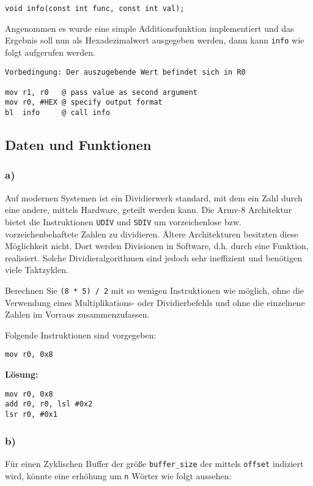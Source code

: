 \documentclass[12pt]{article}
\begin{document}
\begin{lstlisting}
void info(const int func, const int val);
\end{lstlisting}

Angenommen es wurde eine simple Additionsfunktion implementiert und das Ergebnis
soll nun als Hexadezimalwert ausgegeben werden, dann kann \texttt{info} wie
folgt aufgerufen werden.

\begin{lstlisting}
Vorbedingung: Der auszugebende Wert befindet sich in R0

mov r1, r0   @ pass value as second argument
mov r0, #HEX @ specify output format
bl  info     @ call info
\end{lstlisting}


\subsection{Daten und Funktionen}
\subsubsection{a)}
Auf modernen Systemen ist ein Dividierwerk standard, mit dem ein Zahl durch eine
andere, mittels Hardware, geteilt werden kann. Die Armv-8 Architektur bietet
die Instruktionen \texttt{UDIV} und \texttt{SDIV} um vorzeichenlose bzw.
vorzeichenbehaftete Zahlen zu dividieren. Ältere Architekturen besitzten diese
Möglichkeit nicht. Dort werden Divisionen in Software, d.h. durch eine Funktion, realisiert. 
Solche Dividieralgorithmen sind jedoch sehr ineffizient und benötigen viele
Taktzyklen.

Berechnen Sie \texttt{(8 * 5) / 2} mit so wenigen Instruktionen wie
möglich, ohne die Verwendung eines Multiplikations- oder Dividierbefehls und
ohne die einzelnene Zahlen im Vorraus zusammenzufassen.

Folgende Instruktionen sind vorgegeben:
\begin{lstlisting}
mov r0, 0x8
\end{lstlisting}

\textbf{Lösung:}
\begin{lstlisting}
mov r0, 0x8
add r0, r0, lsl #0x2
lsr r0, #0x1
\end{lstlisting}

\subsubsection{b)}
Für einen Zyklischen Buffer der größe \texttt{buffer\_size} der mittels
\texttt{offset} indiziert wird, könnte eine erhöhung um \texttt{n} Wörter wie
folgt aussehen:
\end{document}
